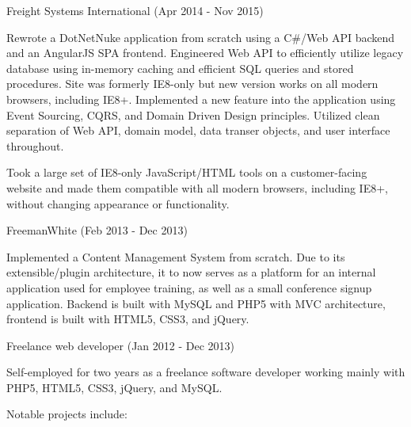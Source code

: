 \documentclass{article}
\begin{document}
    \noindent\makebox[\linewidth]{\rule{\textwidth}{0.4pt}}
    \medskip

    {
        \large
        Freight Systems International
        {
            \color{fade-gray}
            \small
            (Apr 2014 - Nov 2015)
        }
    }

    \medskip

    Rewrote a DotNetNuke application from scratch using a C\#/Web API backend and an AngularJS SPA frontend. Engineered Web API to efficiently utilize legacy database using in-memory caching and efficient SQL queries and stored procedures. Site was formerly IE8-only but new version works on all modern browsers, including IE8+. Implemented a new feature into the application using Event Sourcing, CQRS, and Domain Driven Design principles. Utilized clean separation of Web API, domain model, data transer objects, and user interface throughout.

    \smallskip

    Took a large set of IE8-only JavaScript/HTML tools on a customer-facing website and made them compatible with all modern browsers, including IE8+, without changing appearance or functionality.


    \bigskip\bigskip

    {
        \large
        FreemanWhite 
        {
            \color{fade-gray}
            \small
            (Feb 2013 - Dec 2013)
        }
    }

    \medskip

    Implemented a Content Management System from scratch. Due to its extensible/plugin architecture, it to now serves as a platform for an internal application used for employee training, as well as a small conference signup application. Backend is built with MySQL and PHP5 with MVC architecture, frontend is built with HTML5, CSS3, and jQuery.


    \bigskip\bigskip

    {
        \large
        Freelance web developer 
        {
            \color{fade-gray}
            \small
            (Jan 2012 - Dec 2013)
        }
    }

    \medskip

    Self-employed for two years as a freelance software developer working mainly with PHP5, HTML5, CSS3, jQuery, and MySQL. 
    
    \smallskip

    Notable projects include:
\end{document}
